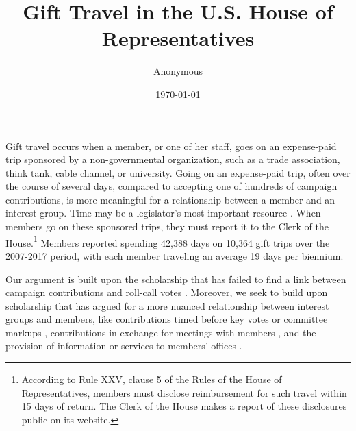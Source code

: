 \documentclass[12pt]{article}                           %
\begin{document}
\title{Gift Travel in the U.S. House of Representatives}
\author{Anonymous}
\date{\today}



\maketitle

\thispagestyle{empty}

\newpage
{}
\thispagestyle{empty}

\newpage
\setcounter{page}{1}

Gift travel occurs when a member, or one of her staff, goes on an expense-paid trip sponsored by a non-governmental organization, such as a trade association, think tank, cable channel, or university. Going on an expense-paid trip, often over the course of several days, compared to accepting one of hundreds of campaign contributions, is more meaningful for a relationship between a member and an interest group. Time may be a legislator's most important resource \citep[34]{Fenno1978}. When members go on these sponsored trips, they must report it to the Clerk of the House.\footnote{According to Rule XXV, clause 5 of the Rules of the House of Representatives, members must disclose reimbursement for such travel within 15 days of return. The Clerk of the House makes a report of these disclosures public on its website.} Members reported spending 42,388 days on 10,364  gift trips over the 2007-2017 period, with each member traveling an average 19 days per biennium.

Our argument is built upon the scholarship that has failed to find a link between campaign contributions and roll-call votes \citep{Welch1982,Wright1990}. Moreover, we seek to build upon scholarship that has argued for a more nuanced relationship between interest groups and members, like contributions timed before key votes or committee markups \citep{Stratmann1998,Hall1990}, contributions in exchange for meetings with members \citep{Langbein1986}, and the provision of information or services to members' offices \citep{Hall2006}.
\end{document}

